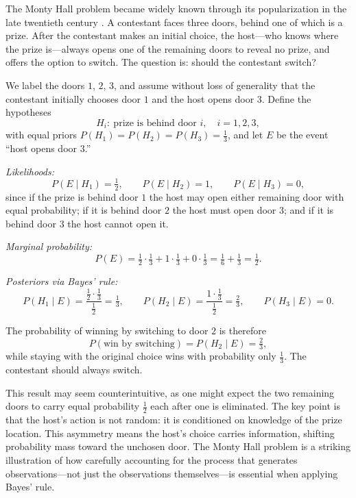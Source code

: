 The Monty Hall problem became widely known through its popularization in the late twentieth century \cite{vos_savant_1990_monty}. A contestant faces three doors, behind one of which is a prize. After the contestant makes an initial choice, the host---who knows where the prize is---always opens one of the remaining doors to reveal no prize, and offers the option to switch. The question is: should the contestant switch?

\medskip

We label the doors $1$, $2$, $3$, and assume without loss of generality that the contestant initially chooses door $1$ and the host opens door $3$. Define the hypotheses
\[
    H_i:\ \text{prize is behind door } i, \quad i=1,2,3,
\]
with equal priors $P(H_1)=P(H_2)=P(H_3)=\tfrac{1}{3}$, and let $E$ be the event ``host opens door $3$.''

\medskip

\textit{Likelihoods:}
\[
    P(E \mid H_1)=\tfrac{1}{2}, \qquad P(E \mid H_2)=1, \qquad P(E \mid H_3)=0,
\]
since if the prize is behind door $1$ the host may open either remaining door with equal probability; if it is behind door $2$ the host must open door $3$; and if it is behind door $3$ the host cannot open it.

\medskip

\textit{Marginal probability:}
\[
    P(E) = \tfrac{1}{2}\cdot\tfrac{1}{3} + 1\cdot\tfrac{1}{3} + 0\cdot\tfrac{1}{3} = \tfrac{1}{6}+\tfrac{1}{3} = \tfrac{1}{2}.
\]

\textit{Posteriors via Bayes' rule:}
\[
    P(H_1 \mid E) = \frac{\tfrac{1}{2}\cdot\tfrac{1}{3}}{\tfrac{1}{2}} = \tfrac{1}{3}, \qquad P(H_2 \mid E) = \frac{1\cdot\tfrac{1}{3}}{\tfrac{1}{2}} = \tfrac{2}{3}, \qquad P(H_3 \mid E) = 0.
\]

The probability of winning by switching to door $2$ is therefore
\[
    P(\text{win by switching}) = P(H_2 \mid E) = \tfrac{2}{3},
\]
while staying with the original choice wins with probability only $\tfrac{1}{3}$. The contestant should always switch.

\medskip

This result may seem counterintuitive, as one might expect the two remaining doors to carry equal probability $\tfrac{1}{2}$ each after one is eliminated. The key point is that the host's action is not random: it is conditioned on knowledge of the prize location. This asymmetry means the host's choice carries information, shifting probability mass toward the unchosen door. The Monty Hall problem is a striking illustration of how carefully accounting for the process that generates observations---not just the observations themselves---is essential when applying Bayes' rule.

